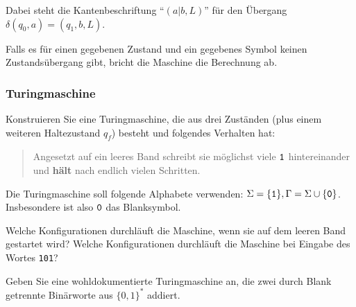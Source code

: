 \documentclass{beamer}
\begin{document}
{{\begin{center}
					\end{center}

					Dabei steht die Kantenbeschriftung ``$(a|b,L)$'' für den Übergang $\delta(q_0,a) =
					(q_1,b,L)$.

					\vspace{2mm}
					Falls es für einen gegebenen Zustand und ein gegebenes
					Symbol keinen Zustandsübergang gibt, bricht die Maschine die Berechnung ab. 
}


\begin{frame}
\frametitle{Turingmaschine}
 \label{sec:busy_beaver}

Konstruieren Sie eine Turingmaschine, die aus drei Zuständen (plus einem
weiteren Haltezustand $q_f$) besteht und folgendes Verhalten hat:
\begin{quote}
  Angesetzt auf ein leeres Band schreibt sie möglichst viele ${\tt 1}$
  hintereinander und \textbf{hält} nach endlich vielen Schritten.
\end{quote}
Die Turingmaschine soll folgende Alphabete verwenden: $\Sigma = \{{\tt 1}\},
\Gamma = \Sigma \cup \{{\tt 0}\}$.  Insbesondere ist also ${\tt 0}$ das
Blanksymbol.

Welche Konfigurationen durchläuft die Maschine, wenn sie auf dem leeren Band
gestartet wird?  Welche Konfigurationen durchläuft die Maschine bei Eingabe
des Wortes {\tt 101}?
\end{frame}
\begin{frame}
 Geben Sie eine wohldokumentierte Turingmaschine an, die zwei durch Blank
getrennte Binärworte aus $\{0,1\}^*$ addiert.
\end{frame}

}
\end{document}
